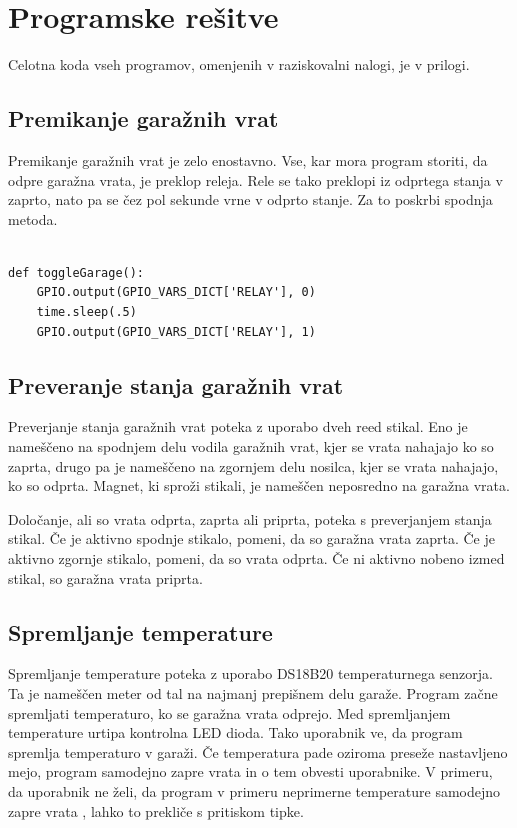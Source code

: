 \documentclass[11pt]{article}
\begin{document}
\section{Programske rešitve}
Celotna koda vseh programov, omenjenih v raziskovalni nalogi, je v prilogi.
\subsection{Premikanje garažnih vrat}
Premikanje garažnih vrat je zelo enostavno. Vse, kar mora program storiti, da odpre garažna vrata, je preklop releja. Rele se tako preklopi iz odprtega stanja v zaprto, nato pa se čez pol sekunde vrne v odprto stanje. Za to poskrbi spodnja metoda.
\begin{verbatim}

def toggleGarage():
    GPIO.output(GPIO_VARS_DICT['RELAY'], 0)
    time.sleep(.5)
    GPIO.output(GPIO_VARS_DICT['RELAY'], 1)
\end{verbatim}
\subsection{Preveranje stanja garažnih vrat}
Preverjanje stanja garažnih vrat poteka z uporabo dveh reed stikal. Eno je nameščeno na spodnjem delu vodila garažnih vrat, kjer se vrata nahajajo ko so zaprta, drugo pa je nameščeno na zgornjem delu nosilca, kjer se vrata nahajajo, ko so odprta. Magnet, ki sproži stikali, je nameščen neposredno na garažna vrata.

Določanje, ali so vrata odprta, zaprta ali priprta, poteka s preverjanjem stanja stikal. Če je aktivno spodnje stikalo, pomeni, da so garažna vrata zaprta. Če je aktivno zgornje stikalo, pomeni, da so vrata odprta. Če ni aktivno nobeno izmed stikal, so garažna vrata priprta.

\subsection{Spremljanje temperature}
Spremljanje temperature poteka z uporabo DS18B20 temperaturnega senzorja. Ta je nameščen meter od tal na najmanj prepišnem delu garaže. Program začne spremljati temperaturo, ko se garažna vrata odprejo. Med spremljanjem temperature urtipa kontrolna LED dioda. Tako uporabnik ve, da program spremlja temperaturo v garaži. Če temperatura pade oziroma preseže nastavljeno mejo, program samodejno zapre vrata in o tem obvesti uporabnike. V primeru, da uporabnik ne želi, da program v primeru neprimerne temperature samodejno zapre vrata , lahko to prekliče s pritiskom tipke.
\end{document}
